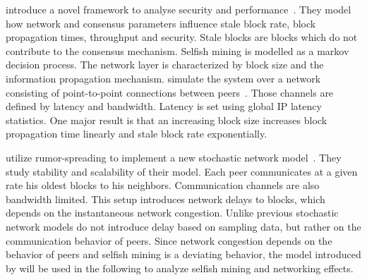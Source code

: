 \citeauthor{gervais2016security} introduce a novel framework to analyse security and performance~\cite{gervais2016security}. They model how network and consensus parameters influence stale block rate, block propagation times, throughput and security. Stale blocks are blocks which do not contribute to the consensus mechanism. Selfish mining is modelled as a markov decision process. The network layer is characterized by block size and the information propagation mechanism. \citeauthor{gervais2016security} simulate the system over a network consisting of point-to-point connections between peers~\cite{gervais2016security}. Those channels are defined by latency and bandwidth. Latency is set using global IP latency statistics. One major result is that an increasing block size increases block propagation time linearly and stale block rate exponentially. 

\citeauthor{gopalan} utilize rumor-spreading to implement a new stochastic network model~\cite{gopalan}. They study stability and scalability of their model. Each peer communicates at a given rate his oldest blocks to his neighbors. Communication channels are also bandwidth limited. This setup introduces network delays to blocks, which depends on the instantaneous network congestion.
Unlike previous stochastic network models \citeauthor{gopalan} do not introduce delay based on sampling data, but rather on the communication behavior of peers. Since network congestion depends on the behavior of peers and selfish mining is a deviating behavior, the model introduced by \citeauthor{gopalan} will be used in the following to analyze selfish mining and networking effects.

